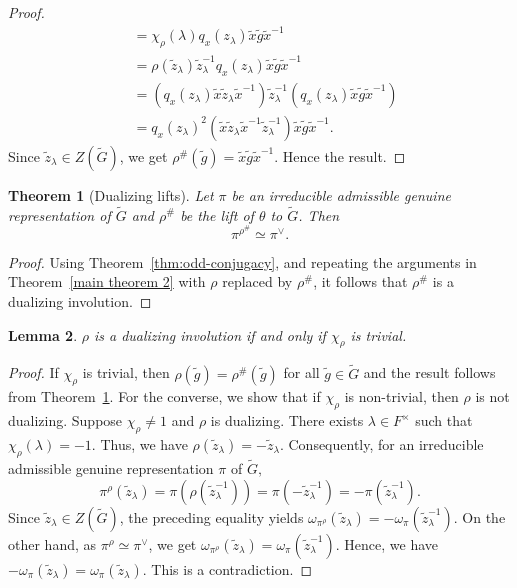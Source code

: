 \documentclass[11pt, a4paper, reqno]{amsart}
\newtheorem{theorem}{Theorem}[section]
\newtheorem{lemma}[theorem]{Lemma}
\theoremstyle{definition}
\theoremstyle{remark}
\theoremstyle{example}
\theoremstyle{note}
\numberwithin{equation}{section}
\begin{document}
\begin{proof}
\begin{align*}
&=\chi_{\rho}(\lambda)q_{x}(z_{\lambda})\tilde{x}\tilde{g}\tilde{x}^{-1}\\
&=\rho(\tilde{z}_{\lambda})\tilde{z}_{\lambda}^{-1}q_{x}(z_{\lambda})\tilde{x}\tilde{g}\tilde{x}^{-1}\\
&= (q_{x}(z_{\lambda})\tilde{x}\tilde{z}_{\lambda}\tilde{x}^{-1}) \tilde{z}_{\lambda}^{-1} (q_{x}(z_{\lambda})\tilde{x}\tilde{g}\tilde{x}^{-1}) \\
& = q_{x}(z_{\lambda})^{2}(\tilde{x}\tilde{z}_{\lambda}\tilde{x}^{-1}\tilde{z}_{\lambda}^{-1}) \tilde{x}\tilde{g}\tilde{x}^{-1}.
\end{align*}
Since $\tilde{z}_{\lambda}\in Z(\widetilde{G})$, we get $\rho^{\#}(\tilde{g})=\tilde{x}\tilde{g}\tilde{x}^{-1}.$ Hence the result.  
\end{proof}



\begin{theorem}[Dualizing lifts]\label{main theorem odd case} Let $\pi$ be an irreducible admissible genuine representation of $\widetilde{G}$ and $\rho^{\#}$ be the lift of $\theta$ to $\widetilde{G}$. Then 
\[\pi^{\rho^{\#}}\simeq \pi^{\vee}.\]
\end{theorem}

\begin{proof} Using Theorem~\ref{thm:odd-conjugacy}, and repeating the arguments in Theorem~\ref{main theorem 2} with $\rho$ replaced by $\rho^{\#}$, it follows that $\rho^{\#}$ is a dualizing involution. 
\end{proof}

\begin{lemma}\label{chirho is trivial iffn} $\rho$ is a dualizing involution if and only if $\chi_\rho$ is trivial.
\end{lemma}

\begin{proof} If $\chi_{\rho}$ is trivial, then $\rho(\tilde{g})=\rho^{\#}(\tilde{g})$ for all $\tilde{g}\in \widetilde{G}$ and the result follows from Theorem~\ref{main theorem odd case}. For the converse, we show that if $\chi_{\rho}$ is non-trivial, then $\rho$ is not dualizing. Suppose $\chi_{\rho}\neq 1$ and $\rho$ is dualizing. There exists $\lambda \in F^{\times}$ such that $\chi_{\rho}(\lambda)=-1$. Thus, we have $\rho(\tilde{z}_{\lambda})= -\tilde{z}_{\lambda}.$ Consequently, for an irreducible admissible genuine representation $\pi$ of $\widetilde{G},$
$$\pi^{\rho}(\tilde{z}_{\lambda}) = \pi(\rho(\tilde{z}_{\lambda}^{-1}))= \pi(-\tilde{z}_{\lambda}^{-1}) = -\pi(\tilde{z}_{\lambda}^{-1}).$$ 
Since $\tilde{z}_{\lambda}\in Z(\widetilde{G})$, the preceding equality yields $\omega_{\pi^{\rho}}(\tilde{z}_{\lambda})= -\omega_{\pi}(\tilde{z}_{\lambda}^{-1})$. On the other hand, as $\pi^{\rho} \simeq \pi^{\vee}$, we get $\omega_{\pi^{\rho}}(\tilde{z}_{\lambda})= \omega_{\pi}(\tilde{z}_{\lambda}^{-1}).$ Hence, we have $-\omega_\pi(\tilde{z}_{\lambda}) = \omega_\pi(\tilde{z}_{\lambda}).$ This is a contradiction. 
\end{proof}
\end{document}
